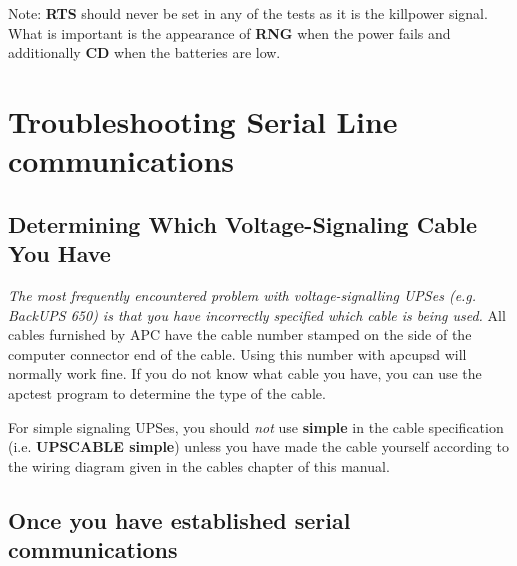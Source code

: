 {{{{{{{{{Note: {\bf RTS} should never be set in any of the tests as it is the killpower
signal. What is important is the appearance of {\bf RNG} when the power fails
and additionally {\bf CD} when the batteries are low. 

\label{Troubleshooting-Serial-Line-communications}

\section*{Troubleshooting Serial Line communications}

\label{index-Problems_002c-Serial-228}
\label{index-Serial-Problems-229}

\label{Determining-Which-Voltage_002dSignaling-Cable-You-Have}

\subsection*{Determining Which Voltage-Signaling Cable You Have}

{\it The most frequently encountered problem with voltage-signalling UPSes
(e.g. BackUPS 650) is that you have incorrectly specified which cable is being
used.} All cables furnished by APC have the cable number stamped on the side
of the computer connector end of the cable. Using this number with apcupsd
will normally work fine. If you do not know what cable you have, you can use
the apctest program to determine the type of the cable.  

For simple signaling UPSes, you should {\it not} use {\bf simple} in the cable
specification (i.e. {\bf UPSCABLE simple}) unless you have made the cable
yourself according to the wiring diagram given in the cables chapter of this
manual. 

\label{Once-you-have-established-serial-communications}

\subsection*{Once you have established serial communications}

}}}}}}}}}
